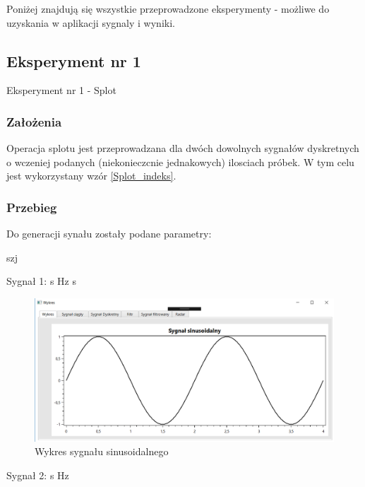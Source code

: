 \documentclass[12pt]{article}
\begin{document}
Poniżej znajdują się wszystkie przeprowadzone eksperymenty - możliwe do uzyskania w aplikacji sygnaly i wyniki. 


\subsection{Eksperyment nr 1}

Eksperyment nr 1 -  Splot\\


\subsubsection{Założenia}
Operacja splotu jest przeprowadzana dla dwóch dowolnych sygnałów dyskretnych o wczeniej podanych (niekonieczcnie jednakowych) ilosciach próbek. W tym celu jest wykorzystany wzór \ref{Splot_indeks}.

\subsubsection{Przebieg}
Do generacji synału zostały podane parametry:

\begin{labeling}{szj}
\item [Sygnał 1:]
 s
 Hz
 s

\begin{figure}[h!]
 \centering
 \includegraphics[width=12.3cm]{sin.PNG}
 \vspace{-0.3cm}
 \caption{Wykres sygnału sinusoidalnego}
 \label{sin}
\end{figure}

\item [Sygnał 2:]
 s
 Hz

\end{labeling}
\end{document}

